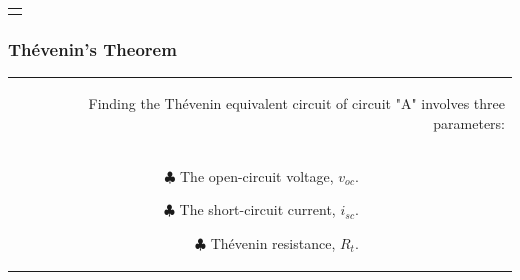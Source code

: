 \documentclass[aspectratio=169]{beamer}
\begin{document}
\begin{frame}[fragile]
\begin{tabular}{r}
\begin{columns}
\begin{column}{.6\textwidth}
\begin{itemize}
			\end{itemize}


	\end{column}

	\end{columns}

\end{tabular}

\end{frame}
\begin{frame}[fragile]
\frametitle{Thévenin's Theorem}
\begin{tabular}{r}
	\begin{columns} \column{1\textwidth}
Finding the Thévenin equivalent circuit of circuit "A" involves three parameters: 
	\end{columns}\\

	\begin{columns}
		
	\begin{column}{.45\textwidth}  %


			\begin{itemize}
			\item[$\clubsuit$]{The open-circuit voltage, $v_{oc}$.\newline }
			\item[$\clubsuit$] {The short-circuit current, $i_{sc}$.\newline }	
			\item[$\clubsuit$]{Thévenin resistance, $R_{t}$.}	
		
			\end{itemize}


	\end{column}
\begin{column}{.5\textwidth}  %
		

\end{column}
\end{columns}
\end{tabular}
\end{frame}
\end{document}
